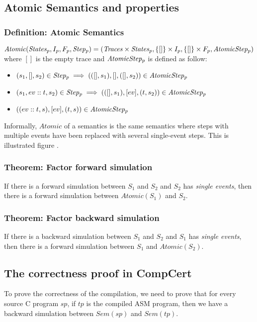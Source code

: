 \subsection{Atomic Semantics and properties}
\subsubsection{Definition: Atomic Semantics} $\mathit{Atomic}(\mathit{States_{p}},I_p,F_p,\mathit{Step_{p}}) = (\mathit{Traces}\times\mathit{States_{p}},\{[]\}\times I_p,\{[]\}\times F_p,\mathit{AtomicStep_{p}})$ where $[]$ is the empty trace and $\mathit{AtomicStep_{p}}$ is defined as follow:
\begin{itemize}
\item $(s_1,[],s_2)\in\mathit{Step_{p}}\implies(([],s_1),[],([],s_2))\in\mathit{AtomicStep_{p}}$
\item $(s_1,ev::t,s_2)\in\mathit{Step_{p}}\implies(([],s_1),[ev],(t,s_2))\in\mathit{AtomicStep_{p}}$
\item $((ev::t,s),[ev],(t,s))\in\mathit{AtomicStep_{p}}$
\end{itemize}
Informally, $\mathit{Atomic}$ of a semantics is the same semantics where steps with multiple events have been replaced with several single-event steps. This is illustrated figure .

\subsubsection{Theorem: Factor forward simulation} If there is a forward simulation between $S_1$ and $S_2$ and $S_2$ has \textit{single events}, then there is a forward simulation between $\mathit{Atomic}(S_1)$ and $S_2$.

\subsubsection{Theorem: Factor backward simulation} If there is a backward simulation between $S_1$ and $S_2$ and $S_1$ has \textit{single events}, then there is a forward simulation between $S_1$ and $\mathit{Atomic}(S_2)$.

\subsection{The correctness proof in CompCert}
To prove the correctness of the compilation, we need to prove that for every source C program $sp$, if $tp$ is the compiled ASM program, then we have a backward simulation between $\mathit{Sem}(sp)$ and $\mathit{Sem}(tp)$.


